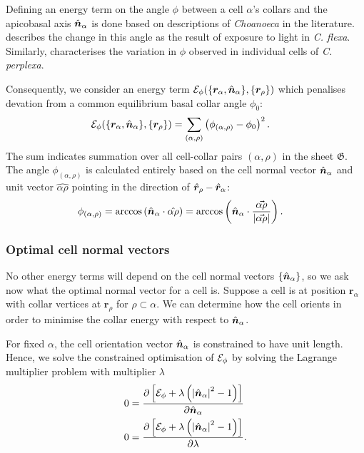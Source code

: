 Defining an energy term on the angle $\phi$ between a cell $\alpha$'s collars and the apicobasal axis $\hat{\bm{n}}_\alpha$ is done based on descriptions of \textit{Choanoeca} in the literature. 
\citet{brunet2019} describes the change in this angle as the result of exposure to light in \textit{C. flexa}.
Similarly, \citet{ellis1930} characterises the variation in $\phi$ observed in individual cells of \textit{C. perplexa}.

Consequently, we consider an energy term $\mathcal{E}_\phi(\{\bm{r}_\alpha, \hat{\bm{n}}_\alpha\}, \{\bm{r}_\rho\})$ which penalises devation from a common equilibrium basal collar angle $\phi_0$:
\begin{align}
	\mathcal{E}_\phi(\{\bm{r}_\alpha, \hat{\bm{n}}_\alpha\}, \{\bm{r}_\rho\}) &= \sum_{(\alpha, \rho)} \left(\phi_{(\alpha, \rho)} - \phi_0 \right)^2. \label{eq:e_phi}
\end{align}
\noindent The sum indicates summation over all cell-collar pairs $(\alpha, \rho)$ in the sheet $\mathfrak{G}$. The angle $\phi_{(\alpha, \rho)}$ is calculated entirely based on the cell normal vector $\hat{\bm{n}}_\alpha$ and unit vector $\hat{\alpha\rho}$ pointing in the direction of $\hat{\bm{r}}_\rho - \hat{\bm{r}}_\alpha$:
\begin{align}
	\phi_{(\alpha, \rho)} &= \arccos \left(\hat{\bm{n}}_\alpha \cdot \hat{\alpha\rho} \right) = \arccos \left(\hat{\bm{n}}_\alpha \cdot \frac{\vec{\alpha\rho}}{\left| \vec{\alpha\rho}\right|} \right). \label{eq:phi}
\end{align}

\subsubsection{Optimal cell normal vectors} \label{subsubsec:opt_norm}

No other energy terms will depend on the cell normal vectors $\{ \hat{\bm{n}}_\alpha \}$, so we ask now what the optimal normal vector for a cell is. Suppose a cell is at position $\bm{r}_\alpha$ with collar vertices at $\bm{r}_\rho$ for $\rho \subset \alpha$. We can determine how the cell orients in order to minimise the collar energy with respect to $\hat{\bm{n}}_\alpha$. 

For fixed $\alpha$, the cell orientation vector $\hat{\bm{n}}_\alpha$ is constrained to have unit length. Hence, we solve the constrained optimisation of $\mathcal{E}_\phi$ by solving the Lagrange multiplier problem with multiplier $\lambda$
\begin{align}
    0 &= \frac{\partial \left[ \mathcal{E}_\phi + \lambda\left( \left| \hat{\bm{n}}_\alpha\right|^2 - 1\right) \right] }{\partial \hat{\bm{n}}_\alpha} \label{eq:philagrange1} \\
    0 &= \frac{\partial \left[ \mathcal{E}_\phi + \lambda\left( \left| \hat{\bm{n}}_\alpha\right|^2 - 1\right)\right] }{\partial \lambda}. \label{eq:philagrange2}
\end{align}


